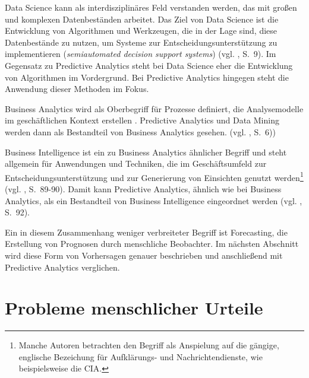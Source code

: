 Data Science kann als interdisziplinäres Feld verstanden werden, das mit
großen und komplexen Datenbeständen arbeitet. Das Ziel von Data Science
ist die Entwicklung von Algorithmen und Werkzeugen, die in der Lage sind, diese
Datenbestände zu nutzen, um Systeme zur Entscheidungsunterstützung zu
implementieren (\emph{semiautomated decision support systems}) (vgl.
\cite{Dinov}, S.~9).  Im Gegensatz zu Predictive Analytics steht bei 
Data Science eher die Entwicklung von Algorithmen im Vordergrund. 
Bei Predictive Analytics hingegen steht die Anwendung dieser Methoden im 
Fokus.

Business Analytics wird als Oberbegriff für Prozesse definiert, die
Analysemodelle im geschäftlichen Kontext erstellen . Predictive Analytics
und Data Mining werden dann als Bestandteil von Business Analytics
gesehen. (vgl. \cite{McCarthy}, S.~6))

Business Intelligence ist ein zu Business Analytics ähnlicher
Begriff und steht allgemein für Anwendungen und Techniken, die im
Geschäftsumfeld zur Entscheidungsunterstützung und zur Generierung von
Einsichten genutzt werden\footnote{
Manche Autoren betrachten den Begriff \grqq{} als Anspielung
auf die gängige, englische Bezeichung für Aufklärungs- und Nachrichtendienste,
wie beispielsweise die CIA.
} (vgl. \cite{Gluchowski}, S.~89-90). Damit kann Predictive Analytics,
ähnlich wie bei Business Analytics, als ein Bestandteil von 
Business Intelligence eingeordnet werden (vgl. \cite{Gluchowski}, S.~92). 

Ein in diesem Zusammenhang weniger verbreiteter Begriff ist Forecasting,
die Erstellung von Prognosen durch menschliche Beobachter. Im nächsten Abschnitt
wird diese Form von Vorhersagen genauer beschrieben und anschließend mit
Predictive Analytics verglichen.  

\section{Probleme menschlicher Urteile}

